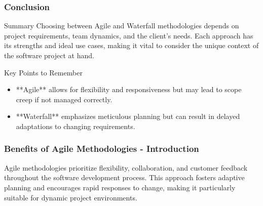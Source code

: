 \documentclass{beamer}
\begin{document}
\begin{frame}[fragile]
    \frametitle{Conclusion}
    \begin{block}{Summary}
        Choosing between Agile and Waterfall methodologies depends on project requirements, team dynamics, and the client’s needs. 
        Each approach has its strengths and ideal use cases, making it vital to consider the unique context of the software project at hand.
    \end{block}
    
    \begin{block}{Key Points to Remember}
        \begin{itemize}
            \item **Agile** allows for flexibility and responsiveness but may lead to scope creep if not managed correctly.
            \item **Waterfall** emphasizes meticulous planning but can result in delayed adaptations to changing requirements.
        \end{itemize}
    \end{block}
\end{frame}

\begin{frame}[fragile]
    \frametitle{Benefits of Agile Methodologies - Introduction}
    Agile methodologies prioritize flexibility, collaboration, and customer feedback throughout the software development process. This approach fosters adaptive planning and encourages rapid responses to change, making it particularly suitable for dynamic project environments.
\end{frame}
\end{document}
